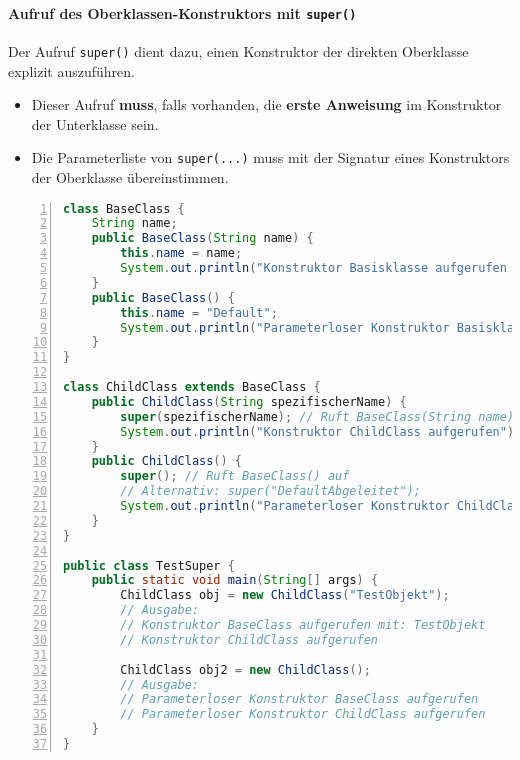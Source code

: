 \paragraph{Aufruf des Oberklassen-Konstruktors mit \texttt{super()}}
Der Aufruf \texttt{super()} dient dazu, einen Konstruktor der direkten Oberklasse explizit auszuführen.
\begin{itemize}
    \item Dieser Aufruf \textbf{muss}, falls vorhanden, die \textbf{erste Anweisung} im Konstruktor der Unterklasse sein.
    \item Die Parameterliste von \texttt{super(...)} muss mit der Signatur eines Konstruktors der Oberklasse übereinstimmen.
\end{itemize}

\begin{lstlisting}[language=Java, caption={Expliziter Aufruf des Oberklassen-Konstruktors via \texttt{super()}}, label=lst:super_konstruktor, 
    basicstyle=\ttfamily\footnotesize, breaklines=true, frame=tb, numbers=left]
class BaseClass {
    String name;
    public BaseClass(String name) {
        this.name = name;
        System.out.println("Konstruktor Basisklasse aufgerufen mit: " + name);
    }
    public BaseClass() {
        this.name = "Default";
        System.out.println("Parameterloser Konstruktor Basisklasse aufgerufen");
    }
}

class ChildClass extends BaseClass {
    public ChildClass(String spezifischerName) {
        super(spezifischerName); // Ruft BaseClass(String name) auf
        System.out.println("Konstruktor ChildClass aufgerufen");
    }
    public ChildClass() {
        super(); // Ruft BaseClass() auf
        // Alternativ: super("DefaultAbgeleitet");
        System.out.println("Parameterloser Konstruktor ChildClass aufgerufen");
    }
}

public class TestSuper {
    public static void main(String[] args) {
        ChildClass obj = new ChildClass("TestObjekt");
        // Ausgabe:
        // Konstruktor BaseClass aufgerufen mit: TestObjekt
        // Konstruktor ChildClass aufgerufen

        ChildClass obj2 = new ChildClass();
        // Ausgabe:
        // Parameterloser Konstruktor BaseClass aufgerufen
        // Parameterloser Konstruktor ChildClass aufgerufen
    }
}
\end{lstlisting}

